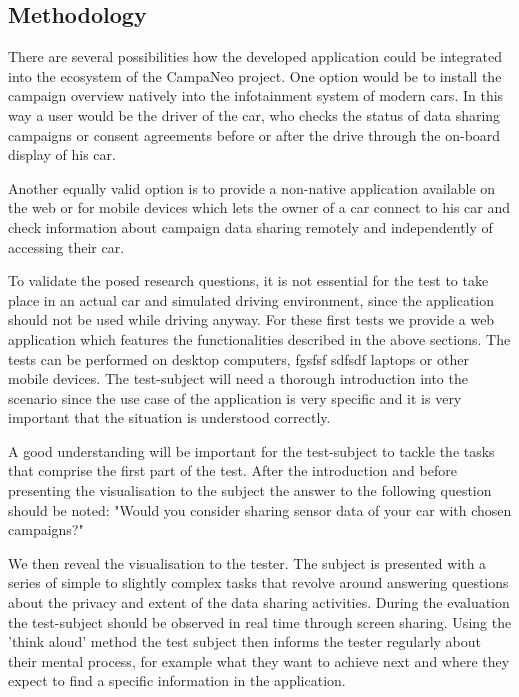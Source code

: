 \documentclass[../paper.tex]{subfiles}
\begin{document}

  \subsection{Methodology}
  There are several possibilities how the developed
  application could be integrated into the ecosystem of the CampaNeo project.
  One option would be to install the campaign overview natively into the
  infotainment system of modern cars.  In this way a user would be the driver
  of the car, who checks the status of data sharing campaigns or consent
  agreements before or after the drive through the on-board display of his car.

  Another equally valid option is to provide a non-native application available
  on the web or for mobile devices which lets the owner of a car connect to his
  car and check information about campaign data sharing remotely and
  independently of accessing their car.

  To validate the posed research questions, it is not essential for the test to
  take place in an actual car and simulated driving environment, since the
  application should not be used while driving anyway. For these first tests we
  provide a web application which features the functionalities described in the
  above sections. The tests can be performed on desktop computers, fgsfsf
  sdfsdf laptops or other mobile devices.  The test-subject will need a
  thorough introduction into the scenario since the use case of the application
  is very specific and it is very important that the situation is understood
  correctly.

  A good understanding will be important for the test-subject to tackle the
  tasks that comprise the first part of the test.  After the introduction and
  before presenting the visualisation to the subject the answer to the
  following question should be noted: "Would you consider sharing sensor data
  of your car with chosen campaigns?"

  We then reveal the visualisation to the tester. The subject is presented with
  a series of simple to slightly complex tasks that revolve around answering
  questions about the privacy and extent of the data sharing activities.
  During the evaluation the test-subject should be observed in real time
  through screen sharing.  Using the 'think aloud' method the test subject then
  informs the tester regularly about their mental process, for example what
  they want to achieve next and where they expect to find a specific
  information in the application.
\end{document}
